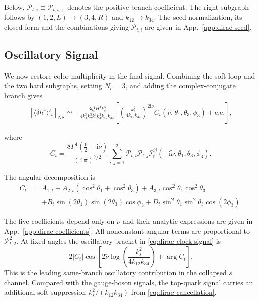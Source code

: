 \documentclass[a4paper,12pt]{article}
\def\to{\rightarrow}
\def\ii{\mathrm{i}}
\def\tn{\tilde\nu}
\begin{document}
Below, $\mathcal P_{t,i}\equiv\mathcal P_{t,i,+}$ denotes the positive-branch coefficient.
The right subgraph follows by $(1,2,L)\to(3,4,R)$ and $k_{12}\to k_{34}$.
The seed normalization, its closed form and the combinations giving $\mathcal P_{t,i}$ are given in App.~\ref{app:dirac-seed}.

\subsection{Oscillatory Signal}
\label{sec:dirac-clock}
We now restore color multiplicity in the final signal.
Combining the soft loop and the two hard subgraphs, setting $N_c=3$, and adding the complex-conjugate branch gives
\begin{align}
 \left[\langle\delta h^4\rangle'_t\right]_{\mathrm{NS}}
 \simeq-\frac{3g_t^4H^4k_s^5}
 {4k_1^3k_2^3k_3^3k_4^3k_{12}k_{34}}
 \left[\left(\frac{k_s^2}{4k_{12}k_{34}}\right)^{2\ii\tn}
 C_t(\tn,\theta_1,\theta_3,\phi_3)+\text{c.c.}\right],
 \label{eq:dirac-clock-signal}
\end{align}

where
\begin{equation}
 C_t=\frac{8\Gamma^4(\tfrac12-\ii\tn)}{(4\pi)^{7/2}}
 \sum_{i,j=1}^2\mathcal P_{t,i}\mathcal P_{t,j}
 \mathcal I^{ij}_t(-\ii\tn,\theta_1,\theta_3,\phi_3).
 \label{eq:dirac-clock-coefficient}
\end{equation}

The angular decomposition is
\begin{align}
 C_t={}&A_{1,t}+A_{2,t}(\cos^2\theta_1+\cos^2\theta_3)
       +A_{3,t}\cos^2\theta_1\cos^2\theta_3\nonumber\\
 &+B_t\sin(2\theta_1)\sin(2\theta_3)\cos\phi_3
  +D_t\sin^2\theta_1\sin^2\theta_3\cos(2\phi_3).
 \label{eq:dirac-angular}
\end{align}

The five coefficients depend only on $\tn$ and their analytic expressions are given in App.~\ref{app:dirac-coefficients}.
All nonconstant angular terms are proportional to $\mathcal P_{t,2}^2$.
At fixed angles the oscillatory bracket in \eqref{eq:dirac-clock-signal} is
\begin{equation}
 2|C_t|\cos\!\left[2\tn\log\!\left(\frac{k_s^2}{4k_{12}k_{34}}\right)
                   +\arg C_t\right].
 \label{eq:dirac-clock-phase}
\end{equation}
This is the leading same-branch oscillatory contribution in the collapsed $s$ channel.
Compared with the gauge-boson signals, the top-quark signal carries an additional soft suppression $k_s^2/(k_{12} k_{34})$ from \eqref{eq:dirac-cancellation}.
\end{document}
